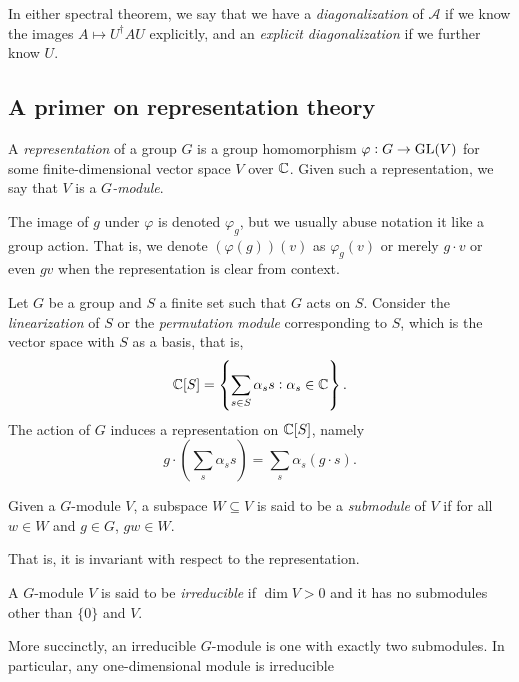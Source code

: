	In either spectral theorem, we say that we have a \emph{diagonalization} of $\mathcal{A}$ if we know the images $A \mapsto U^\dagger A U$ explicitly, and an \emph{explicit diagonalization} if we further know $U$.

\subsection{A primer on representation theory}

	\begin{fdef}
		A \emph{representation} of a group $G$ is a group homomorphism $\varphi : G \to \operatorname{GL}(V)$ for some finite-dimensional vector space $V$ over $\mathbb{C}$. Given such a representation, we say that $V$ is a \emph{$G$-module}.
	\end{fdef}
	The image of $g$ under $\varphi$ is denoted $\varphi_g$, but we usually abuse notation it like a group action. That is, we denote $(\varphi(g))(v)$ as $\varphi_g(v)$ or merely $g \cdot v$ or even $gv$ when the representation is clear from context.

	\begin{fex}
		Let $G$ be a group and $S$ a finite set such that $G$ acts on $S$. Consider the \emph{linearization} of $S$ or the \emph{permutation module} corresponding to $S$, which is the vector space with $S$ as a basis, that is,
		\[ \mathbb{C}[S] = \left\{ \sum_{s \in S} \alpha_s s : \alpha_s \in \mathbb{C} \right\}. \]
		The action of $G$ induces a representation on $\mathbb{C}[S]$, namely
		\[ g \cdot \left( \sum_s \alpha_s s \right) = \sum_s \alpha_s (g \cdot s). \] 
	\end{fex}

	\begin{fdef}
		Given a $G$-module $V$, a subspace $W \subseteq V$ is said to be a \emph{submodule} of $V$ if for all $w \in W$ and $g \in G$, $gw \in W$.
	\end{fdef}
	That is, it is invariant with respect to the representation.

	\begin{fdef}
		A $G$-module $V$ is said to be \emph{irreducible} if $\dim V > 0$ and it has no submodules other than $\{0\}$ and $V$.
	\end{fdef}
	More succinctly, an irreducible $G$-module is one with exactly two submodules. In particular, any one-dimensional module is irreducible

